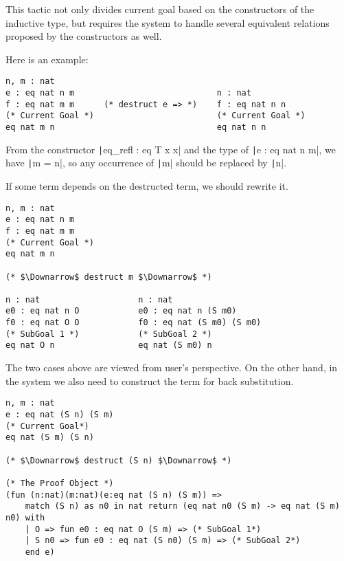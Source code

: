 This tactic not only divides current goal based on the constructors of the inductive
type, but requires the system to handle several equivalent relations proposed by the constructors as well.\par
Here is an example:
\begin{center}
\begin{minipage}{0.7\textwidth}
\begin{verbatim}
n, m : nat                                                      
e : eq nat n m                             n : nat  
f : eq nat m m      (* destruct e => *)    f : eq nat n n    
(* Current Goal *)                         (* Current Goal *)
eq nat m n                                 eq nat n n       
\end{verbatim}
\end{minipage}
\end{center}
From the constructor \texttt|eq_refl : eq T x x| and the type of \texttt|e : eq nat n m|,
we have \texttt|m = n|, so any occurrence of \texttt|m| should be replaced by \texttt|n|.\par
If some term depends on the destructed term, we should rewrite it.
\begin{center}
\begin{minipage}{0.7\textwidth}
\begin{verbatim}
n, m : nat                               
e : eq nat n m                           
f : eq nat m m     
(* Current Goal *)                       
eq nat m n                               

(* $\Downarrow$ destruct m $\Downarrow$ *)  

n : nat                    n : nat                  
e0 : eq nat n O            e0 : eq nat n (S m0) 
f0 : eq nat O O            f0 : eq nat (S m0) (S m0) 
(* SubGoal 1 *)            (* SubGoal 2 *)
eq nat O n                 eq nat (S m0) n     
\end{verbatim}
\end{minipage}
\end{center}
The two cases above are viewed from user's perspective.
On the other hand, in the system we also need to construct the term for back substitution.
\begin{center}
\begin{minipage}{\textwidth}
\begin{verbatim}
n, m : nat                                     
e : eq nat (S n) (S m)  
(* Current Goal*)                              
eq nat (S m) (S n)                             

(* $\Downarrow$ destruct (S n) $\Downarrow$ *)   

(* The Proof Object *)
(fun (n:nat)(m:nat)(e:eq nat (S n) (S m)) =>                                                                                
    match (S n) as n0 in nat return (eq nat n0 (S m) -> eq nat (S m) n0) with 
    | O => fun e0 : eq nat O (S m) => (* SubGoal 1*)                          
    | S n0 => fun e0 : eq nat (S n0) (S m) => (* SubGoal 2*)                  
    end e)                                                  
\end{verbatim}
\end{minipage}
\end{center}
